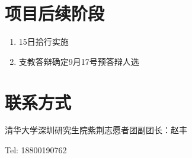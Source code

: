 \documentclass[12pt]{ctexart}
\begin{document}
\section{项目后续阶段}
\begin{enumerate}
\item 15日拾行实施
\item 支教答辩确定9月17号预答辩人选
\end{enumerate}
\section{联系方式}
清华大学深圳研究生院紫荆志愿者团副团长：赵丰

Tel: 18800190762
\end{document}
